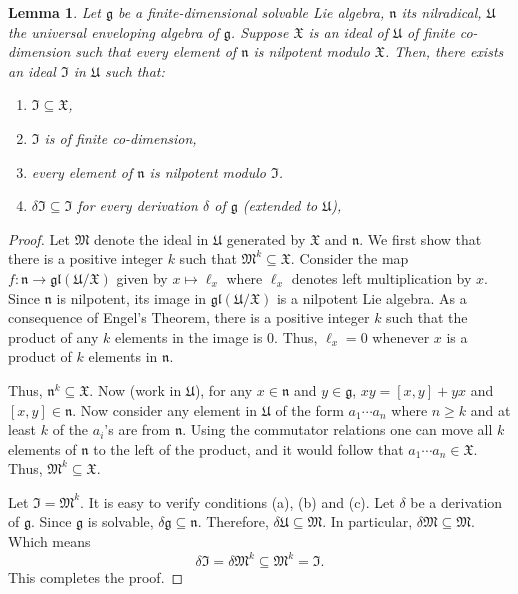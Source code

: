 \documentclass[12pt]{article}
\theoremstyle{thmstyle}
\newtheorem{lemma}[theorem]{Lemma}
\theoremstyle{defstyle}
\newcommand{\frakM}{\mathfrak{M}} %
\newcommand{\frakg}{\mathfrak{g}}
\newcommand{\frakn}{\mathfrak{n}} %
\newcommand{\frakI}{\mathfrak{I}}
\newcommand{\frakU}{\mathfrak{U}}
\newcommand{\frakX}{\mathfrak{X}}
\renewcommand{\ge}{\geqslant}
\newcommand{\gl}{\mathfrak{gl}}
\begin{document}
\begin{lemma}
    Let $\frakg$ be a finite-dimensional solvable Lie algebra, $\frakn$ its nilradical, $\frakU$ the universal enveloping algebra of $\frakg$. Suppose $\frakX$ is an ideal of $\frakU$ of finite co-dimension such that every element of $\frakn$ is nilpotent modulo $\frakX$. Then, there exists an ideal $\frakI$ in $\frakU$ such that: 
    \begin{enumerate}[label=(\alph*)]
        \item $\frakI\subseteq\frakX$,
        \item $\frakI$ is of finite co-dimension, 
        \item every element of $\frakn$ is nilpotent modulo $\frakI$.
        \item $\delta\frakI\subseteq\frakI$ for every derivation $\delta$ of $\frakg$ (extended to $\frakU$),
    \end{enumerate}
\end{lemma}
\begin{proof}
    Let $\frakM$ denote the ideal in $\frakU$ generated by $\frakX$ and $\frakn$. We first show that there is a positive integer $k$ such that $\frakM^k\subseteq\frakX$. Consider the map $f:\frakn\to\gl(\frakU/\frakX)$ given by $x\mapsto\ell_x$ where $\ell_x$ denotes left multiplication by $x$. Since $\frakn$ is nilpotent, its image in $\gl(\frakU/\frakX)$ is a nilpotent Lie algebra. As a consequence of Engel's Theorem, there is a positive integer $k$ such that the product of any $k$ elements in the image is $0$. Thus, $\ell_x = 0$ whenever $x$ is a product of $k$ elements in $\frakn$. 

    Thus, $\frakn^k\subseteq\frakX$. Now (work in $\frakU$), for any $x\in\frakn$ and $y\in\frakg$, $xy = [x, y] + yx$ and $[x, y]\in\frakn$. Now consider any element in $\frakU$ of the form $a_1\cdots a_n$ where $n\ge k$ and at least $k$ of the $a_i$'s are from $\frakn$. Using the commutator relations one can move all $k$ elements of $\frakn$ to the left of the product, and it would follow that $a_1\cdots a_n\in\frakX$. Thus, $\frakM^k\subseteq\frakX$.

    Let $\frakI = \frakM^k$. It is easy to verify conditions (a), (b) and (c). Let $\delta$ be a derivation of $\frakg$. Since $\frakg$ is solvable, $\delta\frakg\subseteq\frakn$.  Therefore, $\delta\frakU\subseteq\frakM$. In particular, $\delta\frakM\subseteq\frakM$. Which means 
    \begin{equation*}
        \delta\frakI = \delta\frakM^k\subseteq\frakM^k = \frakI.
    \end{equation*}
    This completes the proof.
\end{proof} 
\end{document}
